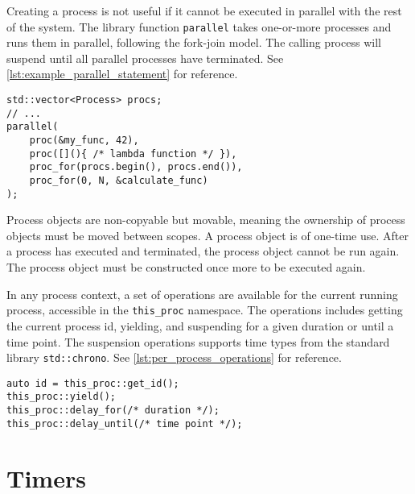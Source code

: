 Creating a process is not useful if it cannot be executed in parallel with the rest of the system. The library function \lstinline[style={CustomC++}]|parallel| takes one\hyp{}or\hyp{}more processes and runs them in parallel, following the fork\hyp{}join model. The calling process will suspend until all parallel processes have terminated. See \cref{lst:example_parallel_statement} for reference.

\begin{lstfloat}
\begin{lstlisting}[caption={Example of the parallel statement.}, label={lst:example_parallel_statement}, style={CustomC++}, xleftmargin={2em}]
std::vector<Process> procs;
// ...
parallel(
    proc(&my_func, 42),
    proc([](){ /* lambda function */ }),
    proc_for(procs.begin(), procs.end()),
    proc_for(0, N, &calculate_func)
);
\end{lstlisting}
\end{lstfloat}

Process objects are non\hyp{}copyable but movable, meaning the ownership of process objects must be moved between scopes. A process object is of one\hyp{}time use. After a process has executed and terminated, the process object cannot be run again. The process object must be constructed once more to be executed again. 

In any process context, a set of operations are available for the current running process, accessible in the \lstinline[style={CustomC++}]|this_proc| namespace. The operations includes getting the current process id, yielding, and suspending for a given duration or until a time point. The suspension operations supports time types from the standard library \lstinline[style={CustomC++}]|std::chrono|. See \cref{lst:per_process_operations} for reference.

\begin{lstfloat}
\begin{lstlisting}[caption={Per process operations for the current executing process.}, label={lst:per_process_operations}, style={CustomC++}, xleftmargin={2em}]
auto id = this_proc::get_id();
this_proc::yield();
this_proc::delay_for(/* duration */);
this_proc::delay_until(/* time point */);
\end{lstlisting}
\end{lstfloat}


\section{Timers}
\label{sec:timer_example}


